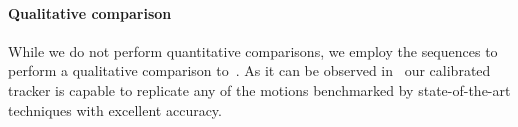 \paragraph{Qualitative comparison}
While we do not perform quantitative comparisons, we employ the \handy{} sequences to perform a qualitative comparison to~\cite{qian2014realtime,sridhar2015fast,sharp2015accurate,taylor2016concerto}. As it can be observed in~ our calibrated tracker is capable to replicate any of the motions benchmarked by state-of-the-art techniques with excellent accuracy.


